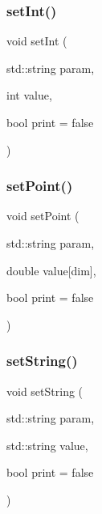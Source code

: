 \subsubsection{\texorpdfstring{set\+Int()}{setInt()}}
{\footnotesize\ttfamily void set\+Int (\begin{DoxyParamCaption}\item[{std\+::string}]{param,  }\item[{int}]{value,  }\item[{bool}]{print = {\ttfamily false} }\end{DoxyParamCaption})}

\mbox{\label{classparameters_class_aeb69e592e5c35d16379edd69a45af4fd}} 
\subsubsection{\texorpdfstring{set\+Point()}{setPoint()}}
{\footnotesize\ttfamily void set\+Point (\begin{DoxyParamCaption}\item[{std\+::string}]{param,  }\item[{double}]{value\mbox{[}dim\mbox{]},  }\item[{bool}]{print = {\ttfamily false} }\end{DoxyParamCaption})}

\mbox{\label{classparameters_class_ab06f012067df1884ecc3a71488aa9ca3}} 
\subsubsection{\texorpdfstring{set\+String()}{setString()}}
{\footnotesize\ttfamily void set\+String (\begin{DoxyParamCaption}\item[{std\+::string}]{param,  }\item[{std\+::string}]{value,  }\item[{bool}]{print = {\ttfamily false} }\end{DoxyParamCaption})}

\mbox{\label{classparameters_class_a8250a061bef7ccda26e06678c8935f43}} 
